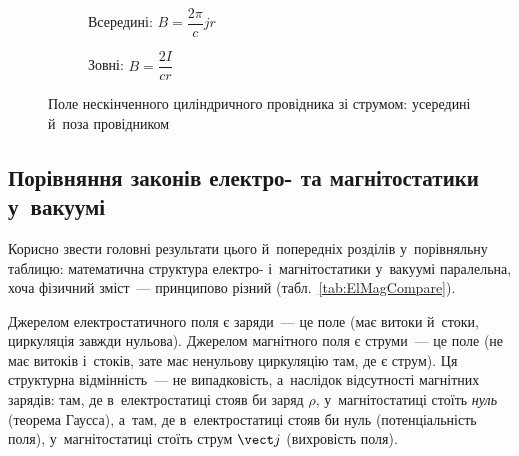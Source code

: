 \begin{figure}[h!]\centering
	\begin{subfigure}[t]{0.48\linewidth}
		\centering
		\caption{Всередині: \( B = \dfrac{2\pi}{c}jr \)}
		\label{pic:cyl_inside}
	\end{subfigure}\hfill
	\begin{subfigure}[t]{0.48\linewidth}
		\centering
		\caption{Зовні: \( B = \dfrac{2I}{cr} \)}
		\label{pic:cyl_outside}
	\end{subfigure}
	\caption{Поле нескінченного циліндричного провідника зі струмом: усередині й~поза
		провідником\label{pic:CylinderField}}
\end{figure}


\subsection*{Порівняння законів електро- та магнітостатики у~вакуумі}


Корисно звести головні результати цього й~попередніх розділів у~порівняльну таблицю:
математична структура електро- і~магнітостатики у~вакуумі паралельна, хоча фізичний
зміст~--- принципово різний (табл.~\ref{tab:ElMagCompare}).

\begin{Attention}
	Джерелом електростатичного поля є заряди~--- це поле  (має витоки
	й~стоки, циркуляція завжди нульова). Джерелом магнітного поля є струми~--- це поле
	 (не має витоків і~стоків, зате має ненульову циркуляцію там, де є
	струм). Ця структурна відмінність~--- не випадковість, а~наслідок відсутності
	магнітних зарядів: там, де в~електростатиці стояв би заряд $\rho$, у~магнітостатиці
	стоїть \emph{нуль} (теорема Гаусса), а~там, де в~електростатиці стояв би нуль
	(потенціальність поля), у~магнітостатиці стоїть струм $\vect j$ (вихровість поля).
\end{Attention}

